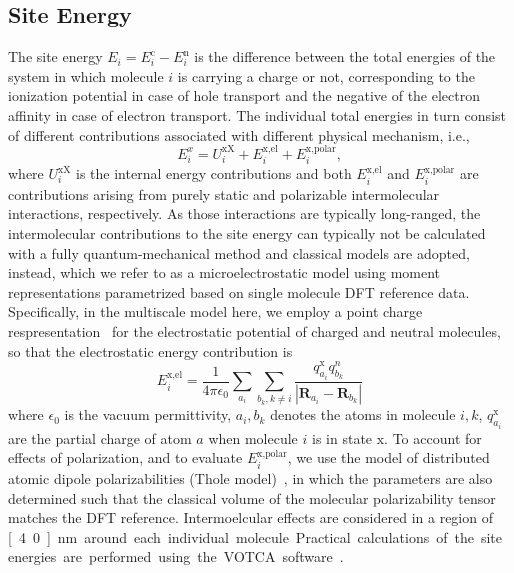 \documentclass[%
 reprint,
superscriptaddress,
 amsmath,amssymb,
 aps,
prb,
floatfix
]{revtex4-2}
\begin{document}
\subsection{Site Energy}
The site energy $E_i = E_i^\text{c} - E_i^\text{n}$ is the difference between the total energies of the system in which molecule $i$ is carrying a charge or not, corresponding to the ionization potential in case of hole transport and the negative of the electron affinity in case of electron transport. The individual total energies in turn consist of different contributions associated with different physical mechanism, i.e.,
%
\begin{equation}
E_i^x = U_i^\text{xX} + E_i^{\text{x},\text{el}} + E_i^{\text{x},\text{polar}},
\label{eq:Es}
\end{equation}
%
where $U_i^\text{xX}$ is the internal energy contributions and both $E_i^{\text{x},\text{el}}$ and $E_i^{\text{x},\text{polar}}$ are contributions arising from purely static and polarizable intermolecular interactions, respectively. As those interactions are typically long-ranged, the intermolecular contributions to the site energy can typically not be calculated with a fully quantum-mechanical method and classical models are adopted, instead, which we refer to as a microelectrostatic model using moment representations parametrized based on single molecule DFT reference data. Specifically, in the multiscale model here, we employ a point charge respresentation~\cite{jcc540110311} for the electrostatic potential of charged and neutral molecules, so that the electrostatic energy contribution is
%
\begin{equation}
    E_i^{\text{x},\text{el}} = \frac{1}{4 \pi \epsilon_0} \sum\limits_{a_i} \sum\limits_{b_k,k \neq i} \frac{q^\text{x}_{a_i}q^n_{b_k}}{ |\mathbf{R}_{a_i} - \mathbf{R}_{b_k}|} 
\end{equation}
%
where $\epsilon_0$ is the vacuum permittivity, $a_i, b_k$ denotes the atoms in molecule $i,k$, $q^{\text{x}}_{a_i}$ are the partial charge of atom $a$ when molecule $i$ is in state $\text{x}$. To account for effects of polarization, and to evaluate $ E_i^{\text{x},\text{polar}}$, we use the model of distributed atomic dipole polarizabilities (Thole model)~\cite{thole_molecular_1981}, in which the parameters are also determined such that the classical volume of the molecular polarizability tensor matches the DFT reference.
Intermoelcular effects are considered in a region of \unit[4.0]{nm} around each individual molecule. Practical calculations of the site energies are performed using the VOTCA software~\cite{Baumeier2011,doi:10.1021/acs.jctc.8b00617,10.1063/1.5144277,Baumeier2024}.
\end{document}
